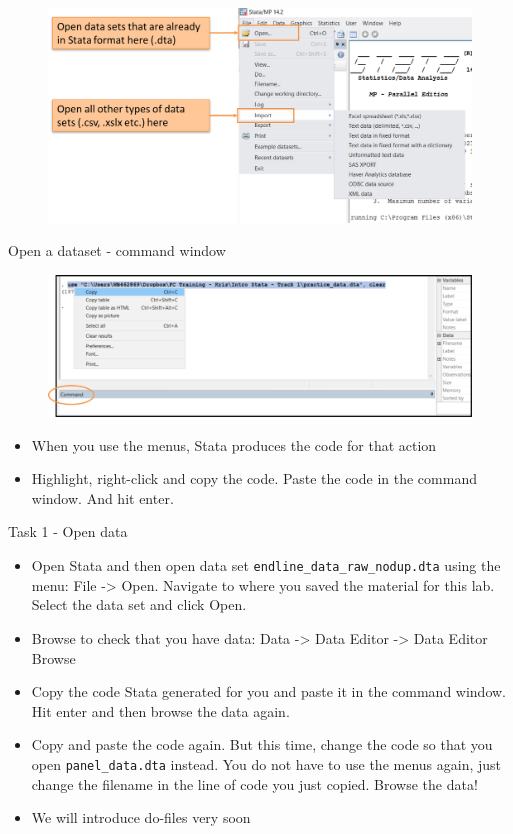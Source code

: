 \documentclass[aspectratio=169]{beamer}
\begin{document}
\begin{frame}{}
	\begin{figure}
		\centering
		\includegraphics[width=\linewidth]{img/open_dataset_menu}
	\end{figure}
\end{frame}

\begin{frame}[fragile]{Open a dataset - command window}
	\begin{figure}
		\centering
		\includegraphics[width=\linewidth]{img/open_data_command}
	\end{figure}
	\begin{itemize}
		\item When you use the menus, Stata produces the code for that action
		\item Highlight, right-click and copy the code. Paste the code in the command window. And hit enter.
	\end{itemize}
\end{frame}

\begin{frame}{Task 1 - Open data}
	\begin{itemize}
		\item Open Stata and then open data set \texttt{endline\_data\_raw\_nodup.dta} using the menu: File -> Open. Navigate to where you saved the material for this lab. Select the data set and click Open.
		\item Browse to check that you have data: Data -> Data Editor -> Data Editor Browse
		\item Copy the code Stata generated for you and paste it in the command window. Hit enter and then browse the data again.
		\item Copy and paste the code again. But this time, change the code so that you open \texttt{panel\_data.dta} instead. You do not have to use the menus again, just change the filename in the line of code you just copied. Browse the data!
		\item We will introduce do-files very soon
	\end{itemize}
\end{frame}
\end{document}

